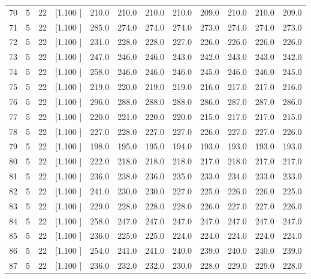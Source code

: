 \documentclass[12pt,a4paper]{article}
\begin{document}
\begin{center}
{\begin{tabular}{r r r r r r r r r r r r}
  70&  5& 22&[1.100     ]&   210.0&   210.0&   210.0&   210.0&   209.0&   210.0&   210.0&   209.0\\[-0.02in]
  71&  5& 22&[1.100     ]&   285.0&   274.0&   274.0&   274.0&   273.0&   274.0&   274.0&   273.0\\[-0.02in]
  72&  5& 22&[1.100     ]&   231.0&   228.0&   228.0&   227.0&   226.0&   226.0&   226.0&   226.0\\[-0.02in]
  73&  5& 22&[1.100     ]&   247.0&   246.0&   246.0&   243.0&   242.0&   243.0&   243.0&   242.0\\[-0.02in]
  74&  5& 22&[1.100     ]&   258.0&   246.0&   246.0&   246.0&   245.0&   246.0&   246.0&   245.0\\[-0.02in]
  75&  5& 22&[1.100     ]&   219.0&   220.0&   219.0&   219.0&   216.0&   217.0&   217.0&   216.0\\[-0.02in]
  76&  5& 22&[1.100     ]&   296.0&   288.0&   288.0&   288.0&   286.0&   287.0&   287.0&   286.0\\[-0.02in]
  77&  5& 22&[1.100     ]&   220.0&   221.0&   220.0&   220.0&   215.0&   217.0&   217.0&   215.0\\[-0.02in]
  78&  5& 22&[1.100     ]&   227.0&   228.0&   227.0&   227.0&   226.0&   227.0&   227.0&   226.0\\[-0.02in]
  79&  5& 22&[1.100     ]&   198.0&   195.0&   195.0&   194.0&   193.0&   193.0&   193.0&   193.0\\[-0.02in]
  80&  5& 22&[1.100     ]&   222.0&   218.0&   218.0&   218.0&   217.0&   218.0&   217.0&   217.0\\[-0.02in]
  81&  5& 22&[1.100     ]&   236.0&   238.0&   236.0&   235.0&   233.0&   234.0&   233.0&   233.0\\[-0.02in]
  82&  5& 22&[1.100     ]&   241.0&   230.0&   230.0&   227.0&   225.0&   226.0&   226.0&   225.0\\[-0.02in]
  83&  5& 22&[1.100     ]&   229.0&   228.0&   228.0&   228.0&   226.0&   227.0&   227.0&   226.0\\[-0.02in]
  84&  5& 22&[1.100     ]&   258.0&   247.0&   247.0&   247.0&   247.0&   247.0&   247.0&   247.0\\[-0.02in]
  85&  5& 22&[1.100     ]&   236.0&   225.0&   225.0&   224.0&   224.0&   224.0&   224.0&   224.0\\[-0.02in]
  86&  5& 22&[1.100     ]&   254.0&   241.0&   241.0&   240.0&   239.0&   240.0&   240.0&   239.0\\[-0.02in]
  87&  5& 22&[1.100     ]&   236.0&   232.0&   232.0&   230.0&   228.0&   229.0&   229.0&   228.0\\[-0.02in]

\end{tabular}}
\end{center}
\end{document}
